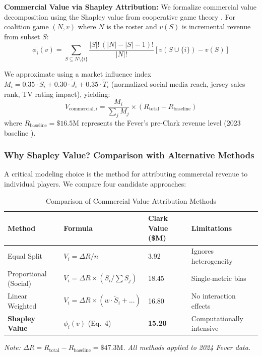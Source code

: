 \documentclass{mcmthesis}
\begin{document}
\textbf{Commercial Value via Shapley Attribution:} We formalize commercial value decomposition using the Shapley value from cooperative game theory \cite{shapley1953}. For coalition game $(N, v)$ where $N$ is the roster and $v(S)$ is incremental revenue from subset $S$:
\begin{equation}
\phi_i(v) = \sum_{S \subseteq N \setminus \{i\}} \frac{|S|!\,(|N|-|S|-1)!}{|N|!} \left[ v(S \cup \{i\}) - v(S) \right]
\end{equation}

We approximate using a market influence index $M_i = 0.35 \cdot \tilde{S}_i + 0.30 \cdot \tilde{J}_i + 0.35 \cdot \tilde{T}_i$ (normalized social media reach, jersey sales rank, TV rating impact), yielding:
\begin{equation}
V_{\text{commercial},i} = \frac{M_i}{\sum_j M_j} \times (R_{\text{total}} - R_{\text{baseline}})
\end{equation}
where $R_{\text{baseline}} = \$16.5$M represents the Fever's pre-Clark revenue level (2023 baseline \cite{forbes2024wnba}).

\subsubsection{Why Shapley Value? Comparison with Alternative Methods}

A critical modeling choice is the method for attributing commercial revenue to individual players. We compare four candidate approaches:

\begin{table}[H]
\centering
\caption{Comparison of Commercial Value Attribution Methods}
\label{tab:method_comparison}
\small
\begin{tabular}{p{2.5cm}p{4.0cm}p{3.2cm}p{5.0cm}}
\toprule
\textbf{Method} & \textbf{Formula} & \textbf{Clark Value (\$M)} & \textbf{Limitations} \\
\midrule
Equal Split & $V_i = \Delta R / n$ & 3.92 & Ignores heterogeneity \\
Proportional (Social) & $V_i = \Delta R \times (S_i / \sum S_j)$ & 18.45 & Single-metric bias \\
Linear Weighted & $V_i = \Delta R \times (w \cdot \tilde{S}_i + ...)$ & 16.80 & No interaction effects \\
\textbf{Shapley Value} & $\phi_i(v)$ (Eq.\ 4) & \textbf{15.20} & Computationally intensive \\
\bottomrule
\end{tabular}
\begin{flushleft}
\footnotesize\textit{Note: $\Delta R = R_{\text{total}} - R_{\text{baseline}} = \$47.3\text{M}$. All methods applied to 2024 Fever data.}
\end{flushleft}
\end{table}
\end{document}
